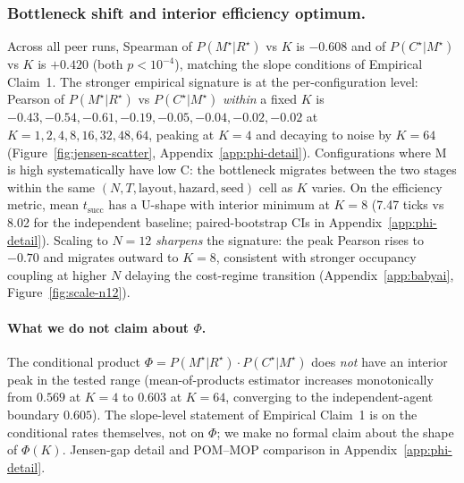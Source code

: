 \documentclass{article}
\begin{document}
\subsubsection{Bottleneck shift and interior efficiency optimum.}
Across all peer runs, Spearman of $P(M^\star|R^\star)$ vs $K$ is $-0.608$ and of $P(C^\star|M^\star)$ vs $K$ is $+0.420$ (both $p<10^{-4}$), matching the slope conditions of Empirical Claim~1. The stronger empirical signature is at the per-configuration level: Pearson of $P(M^\star|R^\star)$ vs $P(C^\star|M^\star)$ \emph{within} a fixed $K$ is $-0.43, -0.54, -0.61, -0.19, -0.05, -0.04, -0.02, -0.02$ at $K{=}1,2,4,8,16,32,48,64$, peaking at $K{=}4$ and decaying to noise by $K{=}64$ (Figure~\ref{fig:jensen-scatter}, Appendix~\ref{app:phi-detail}). Configurations where M is high systematically have low C: the bottleneck migrates between the two stages within the same $(N,T,\text{layout},\text{hazard},\text{seed})$ cell as $K$ varies. On the efficiency metric, mean $t_{\mathrm{succ}}$ has a U-shape with interior minimum at $K{=}8$ (7.47 ticks vs 8.02 for the independent baseline; paired-bootstrap CIs in Appendix~\ref{app:phi-detail}). Scaling to $N{=}12$ \emph{sharpens} the signature: the peak Pearson rises to $-0.70$ and
migrates outward to $K\!=\!8$, consistent with stronger occupancy
coupling at higher $N$ delaying the cost-regime transition
(Appendix~\ref{app:babyai}, Figure~\ref{fig:scale-n12}).

\paragraph{What we do not claim about $\Phi$.} The conditional product $\Phi = P(M^\star|R^\star)\!\cdot\!P(C^\star|M^\star)$ does \emph{not} have an interior peak in the tested range (mean-of-products estimator increases monotonically from $0.569$ at $K{=}4$ to $0.603$ at $K{=}64$, converging to the independent-agent boundary $0.605$). The slope-level statement of Empirical Claim~1 is on the conditional rates themselves, not on $\Phi$; we make no formal claim about the shape of $\Phi(K)$. Jensen-gap detail and POM--MOP comparison in Appendix~\ref{app:phi-detail}.
\end{document}
